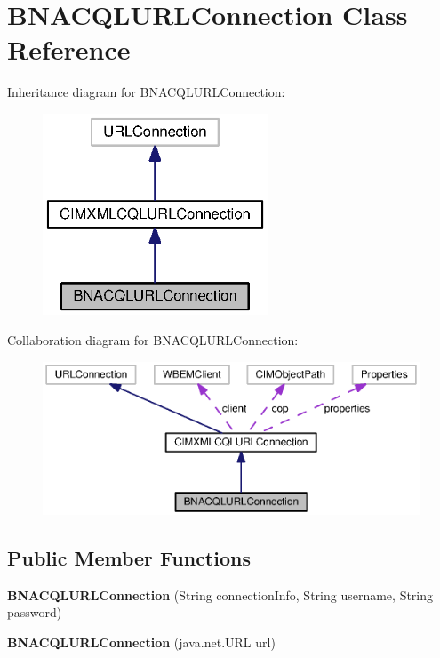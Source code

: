 \section{B\+N\+A\+C\+Q\+L\+U\+R\+L\+Connection Class Reference}
\label{classorg_1_1smallfoot_1_1parser_1_1bnacql_1_1BNACQLURLConnection}


Inheritance diagram for B\+N\+A\+C\+Q\+L\+U\+R\+L\+Connection\+:
\nopagebreak
\begin{figure}[H]
\begin{center}
\leavevmode
\includegraphics[width=190pt]{classorg_1_1smallfoot_1_1parser_1_1bnacql_1_1BNACQLURLConnection__inherit__graph}
\end{center}
\end{figure}


Collaboration diagram for B\+N\+A\+C\+Q\+L\+U\+R\+L\+Connection\+:
\nopagebreak
\begin{figure}[H]
\begin{center}
\leavevmode
\includegraphics[width=350pt]{classorg_1_1smallfoot_1_1parser_1_1bnacql_1_1BNACQLURLConnection__coll__graph}
\end{center}
\end{figure}
\subsection*{Public Member Functions}
\begin{DoxyCompactItemize}
\item 
{\bf B\+N\+A\+C\+Q\+L\+U\+R\+L\+Connection} (String connection\+Info, String username, String password)
\item 
{\bf B\+N\+A\+C\+Q\+L\+U\+R\+L\+Connection} (java.\+net.\+U\+R\+L url)
\end{DoxyCompactItemize}
